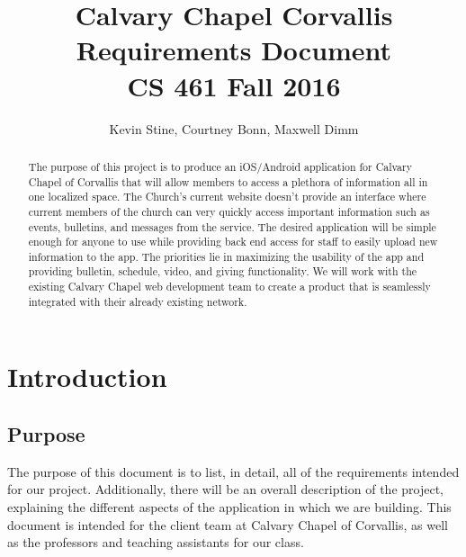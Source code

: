 \documentclass[letterpaper,10pt,draftclsnofoot,onecolumn,compsoc,titlepage]{IEEEtran}
\def\name{Kevin Stine, Courtney Bonn, Maxwell Dimm}
\def\team{Calvary Chapel Corvallis}
\begin{document}
	\title{\huge \team \\ Requirements Document \\ CS 461 Fall 2016}
	\author{\large \name}

	\maketitle
		\begin{abstract}The purpose of this project is to produce an iOS/Android application for Calvary Chapel of Corvallis that will allow members to access a plethora of information all in one localized space.
		The Church's current website doesn't provide an interface where current members of the church can very quickly access important information such as events, bulletins, and messages from the service.
		The desired application will be simple enough for anyone to use while providing back end access for staff to easily upload new information to the app.
		The priorities lie in maximizing the usability of the app and providing bulletin, schedule, video, and giving functionality.
		We will work with the existing Calvary Chapel web development team to create a product that is seamlessly integrated with their already existing network.
		\end{abstract}

	\clearpage

	\tableofcontents

	\clearpage

	\section{Introduction}
	\subsection{Purpose}
	The purpose of this document is to list, in detail, all of the requirements intended for our project.
	Additionally, there will be an overall description of the project, explaining the different aspects of the application in which we are building.
	This document is intended for the client team at Calvary Chapel of Corvallis, as well as the professors and teaching assistants for our class.
\end{document}
